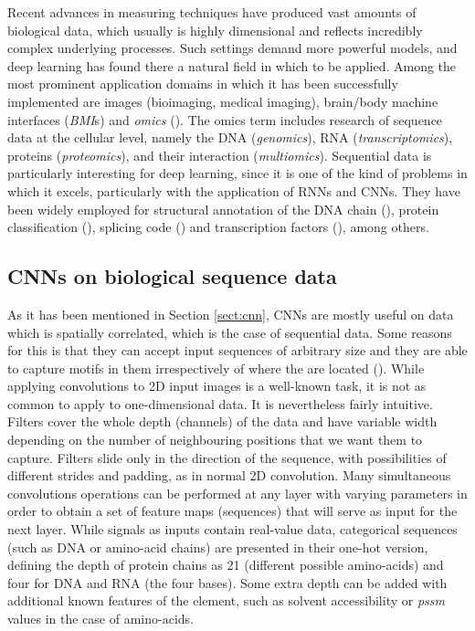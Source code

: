 Recent advances in measuring techniques have produced vast amounts of biological data, which usually is highly dimensional and reflects incredibly complex underlying processes. Such settings demand more powerful models, and deep learning has found there a natural field in which to be applied. Among the most prominent application domains in which it has been successfully implemented are images (bioimaging, medical imaging), brain/body machine interfaces (\textit{BMI}s) and \textit{omics} (\cite{Mahmud2018}). The omics term includes research of sequence data at the cellular level, namely the DNA (\textit{genomics}), RNA (\textit{transcriptomics}), proteins (\textit{proteomics}), and their interaction (\textit{multiomics}). Sequential data is particularly interesting for deep learning, since it is one of the kind of problems in which it excels, particularly with the application of RNNs and CNNs. They have been widely employed for structural annotation of the DNA chain (\cite{Jones2017}), protein classification (\cite{Min2017}), splicing code (\cite{Mamoshina2016}) and transcription factors (\cite{Ching2017}), among others.

	\subsection{CNNs on biological sequence data}
	As it has been mentioned in Section \ref{sect:cnn}, CNNs are mostly useful on data which is spatially correlated, which is the case of sequential data. Some reasons for this is that they can accept input sequences of arbitrary size and they are able to capture motifs in them irrespectively of where the are located (\cite{Jurtz2017}). While applying convolutions to 2D input images is a well-known task, it is not as common to apply to one-dimensional data. It is nevertheless fairly intuitive. Filters cover the whole depth (channels) of the data and have variable width depending on the number of neighbouring positions that we want them to capture. Filters slide only in the direction of the sequence, with possibilities of different strides and padding, as in normal 2D convolution. Many simultaneous convolutions operations can be performed at any layer with varying parameters in order to obtain a set of feature maps (sequences) that will serve as input for the next layer. While signals as inputs contain real-value data, categorical sequences (such as DNA or amino-acid chains) are presented in their one-hot version, defining the depth of protein chains as 21 (different possible amino-acids) and four for DNA and RNA (the four bases). Some extra depth can be added with additional known features of the element, such as solvent accessibility or \textit{pssm} values in the case of amino-acids.
	
